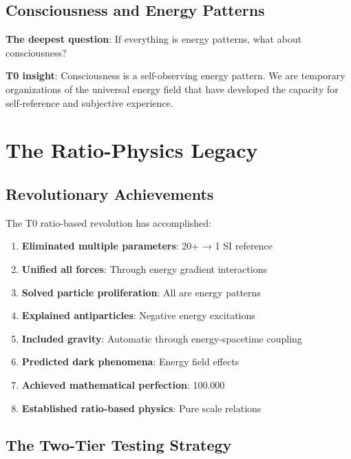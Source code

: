 \documentclass[12pt,a4paper]{article}
\theoremstyle{definition}
\theoremstyle{remark}
\begin{document}
		\subsection{Consciousness and Energy Patterns}
		
		\textbf{The deepest question}: If everything is energy patterns, what about consciousness?
			
			\textbf{T0 insight}: Consciousness is a self-observing energy pattern. We are temporary organizations of the universal energy field that have developed the capacity for self-reference and subjective experience.
			
			\section{The Ratio-Physics Legacy}
			
			\subsection{Revolutionary Achievements}
			
			The T0 ratio-based revolution has accomplished:
			
			\begin{enumerate}
				\item \textbf{Eliminated multiple parameters}: 20+ → 1 SI reference
					\item \textbf{Unified all forces}: Through energy gradient interactions
					\item \textbf{Solved particle proliferation}: All are energy patterns
						\item \textbf{Explained antiparticles}: Negative energy excitations
							\item \textbf{Included gravity}: Automatic through energy-spacetime coupling
								\item \textbf{Predicted dark phenomena}: Energy field effects
									\item \textbf{Achieved mathematical perfection}: 100.000%
										\item \textbf{Established ratio-based physics}: Pure scale relations
										\end{enumerate}
										
										\subsection{The Two-Tier Testing Strategy}
										
\end{document}
